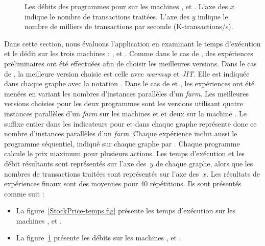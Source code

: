 \begin{figure}



\caption[Les débits pour  sur
les machines ,  et .]{Les débits des programmes
pour  sur les machines ,  et . L'axe des $x$
indique le nombre de transactions traitées. L'axe des $y$ indique le nombre de milliers de transactions par seconde (K-transactions/s).}
\label{StockPrice-debits.fig}
\end{figure}


Dans cette section, nous \'evaluons l'application  en examinant le temps d'ex\'ecution et le d\'edit sur les trois machines : ,  et . Comme dans le cas de , des exp\'eriences pr\'eliminaires ont \'et\'e effectu\'ees afin de choisir les meilleures versions. Dans le cas de , la meilleure version choisie est celle avec \emph{warmup} et \emph{JIT}. Elle est indiqu\'ee dans chaque graphe avec la notation . Dans le cas de  et , les exp\'eriences ont \'et\'e men\'ees en variant les nombres d'instances parall\`eles d'un \emph{farm}. Les meilleures versions choisies pour les deux programmes sont les versions utilisant quatre instances parall\`eles d'un \emph{farm} sur les machines  et  et deux sur la machine . Le suffixe entier dans les indicateurs pour  et  dans chaque graphe repr\'esente donc ce nombre d'instances parall\`eles d'un \emph{farm}. Chaque exp\'erience inclut aussi le programme s\'equentiel, indiqu\'e sur chaque graphe par . Chaque programme calcule le prix maximum pour plusieurs actions. Les temps d'ex\'ecution et les d\'ebit r\'esultants sont repr\'esent\'es sur l'axe des~$y$ de chaque graphe, alors que les nombres de transactions trait\'ees sont repr\'esent\'es sur l'axe des~$x$. Les r\'esultats de exp\'eriences finaux sont des moyennes pour 40 r\'ep\'etitions. Ils sont pr\'esent\'es comme suit :


\begin{itemize}

\item La figure~\ref{StockPrice-temps.fig} pr\'esente les temps d'ex\'ecution sur les machines ,  et .

\item La figure~\ref{StockPrice-debits.fig} pr\'esente les d\'ebits sur les machines ,  et .

\end{itemize}


